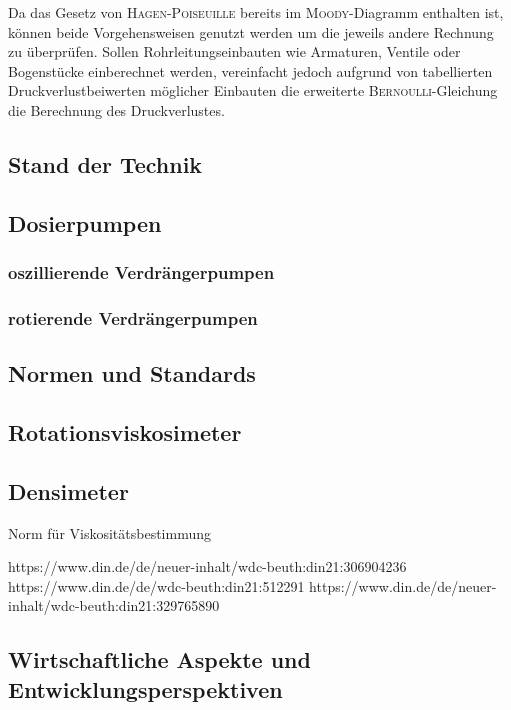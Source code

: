 Da das Gesetz von \textsc{Hagen}-\textsc{Poiseuille} bereits im \textsc{Moody}-Diagramm enthalten ist, können beide Vorgehensweisen genutzt werden um die jeweils andere Rechnung zu überprüfen. Sollen Rohrleitungseinbauten wie Armaturen, Ventile oder Bogenstücke einberechnet werden, vereinfacht jedoch aufgrund von tabellierten Druckverlustbeiwerten möglicher Einbauten die erweiterte \textsc{Bernoulli}-Gleichung die Berechnung des Druckverlustes.



\subsection{Stand der Technik}
\subsection{Dosierpumpen}
\subsubsection{oszillierende Verdrängerpumpen}
\subsubsection{rotierende Verdrängerpumpen}

\subsection{Normen und Standards}

\subsection{Rotationsviskosimeter}
\subsection{Densimeter}

Norm für Viskositätsbestimmung

https://www.din.de/de/neuer-inhalt/wdc-beuth:din21:306904236
https://www.din.de/de/wdc-beuth:din21:512291
https://www.din.de/de/neuer-inhalt/wdc-beuth:din21:329765890

\subsection{Wirtschaftliche Aspekte und Entwicklungsperspektiven}